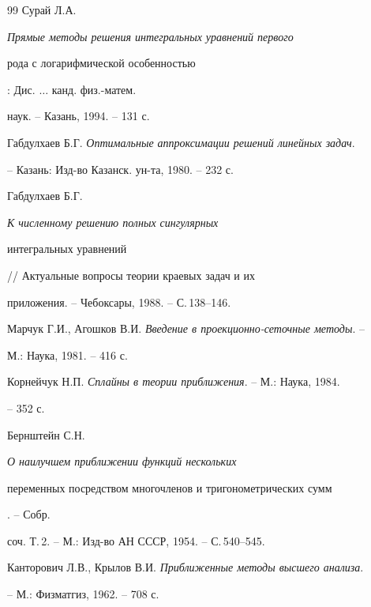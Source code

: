 \begin{thebibliography}{99}
Сурай Л.А. {\em Прямые методы решения интегральных уравнений первого 


рода с логарифмической особенностью}: Дис. $\dotsc$ канд. физ.-матем. 


наук. -- Казань, 1994. -- 131 с. 




Габдулхаев Б.Г. {\em Оптимальные аппроксимации решений линейных задач}. 


-- Казань: Изд-во Казанск. ун-та, 1980. -- 232 с.




Габдулхаев Б.Г. {\em К численному решению полных сингулярных 


интегральных уравнений} // Актуальные вопросы теории краевых задач и их 


приложения. -- Чебоксары, 1988. -- С.\,138--146. 




Марчук Г.И., Агошков В.И. {\em Введение в проекционно-сеточные методы}. -- 


М.: Наука, 1981. -- 416 с. 




Корнейчук Н.П. {\em Сплайны в теории приближения}. -- М.: Наука, 1984. 


-- 352 с. 




Бернштейн С.Н. {\em О наилучшем приближении функций нескольких 


переменных посредством многочленов и тригонометрических сумм}. -- Собр. 


соч. Т.\,2. -- М.: Изд-во АН СССР, 1954. -- С.\,540--545. 




Канторович Л.В., Крылов В.И. {\em Приближенные методы высшего анализа}. 


-- М.: Физматгиз, 1962. -- 708 с. 


 


 


\end{thebibliography} 


 


\vskip 2cm 


 






\smallskip 






 


 


\label{end} 


 


